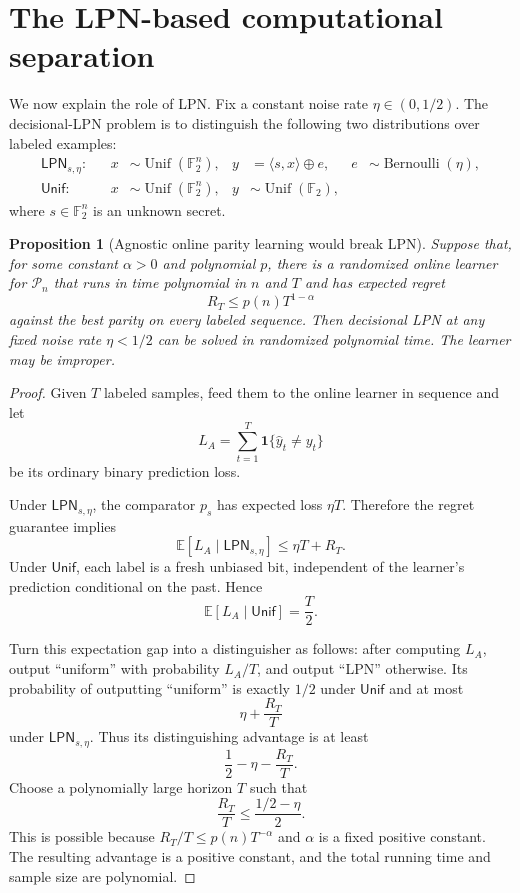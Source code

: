 \documentclass[11pt]{article}
\newtheorem{proposition}[theorem]{Proposition}
\theoremstyle{definition}
\theoremstyle{remark}
\newcommand{\F}{\mathbb{F}_2}
\newcommand{\Pn}{\mathcal{P}_n}
\newcommand{\ip}[2]{\langle #1,#2\rangle}
\newcommand{\ind}{\mathbf{1}}
\begin{document}
\section{The LPN-based computational separation}

We now explain the role of LPN.  Fix a constant noise rate
$\eta\in(0,1/2)$.  The decisional-LPN problem is to distinguish the following
two distributions over labeled examples:
\begin{align*}
\mathsf{LPN}_{s,\eta}:&
&x&\sim\operatorname{Unif}(\F^n),
&y&=\ip{s}{x}\oplus e,
&e&\sim\operatorname{Bernoulli}(\eta),\\
\mathsf{Unif}:&
&x&\sim\operatorname{Unif}(\F^n),
&y&\sim\operatorname{Unif}(\F),
\end{align*}
where $s\in\F^n$ is an unknown secret.

\begin{proposition}[Agnostic online parity learning would break LPN]
Suppose that, for some constant $\alpha>0$ and polynomial $p$, there is a
randomized online learner for $\Pn$ that runs in time polynomial in $n$ and
$T$ and has expected regret
\[
  R_T\leq p(n)T^{1-\alpha}
\]
against the best parity on every labeled sequence.  Then decisional LPN at
any fixed noise rate $\eta<1/2$ can be solved in randomized polynomial time.
The learner may be improper.
\end{proposition}

\begin{proof}
Given $T$ labeled samples, feed them to the online learner in sequence and
let
\[
  L_A
  =
  \sum_{t=1}^T \ind\{\widehat y_t\neq y_t\}
\]
be its ordinary binary prediction loss.

Under $\mathsf{LPN}_{s,\eta}$, the comparator $p_s$ has expected loss
$\eta T$.  Therefore the regret guarantee implies
\[
  \mathbb{E}[L_A\mid\mathsf{LPN}_{s,\eta}]
  \leq
  \eta T+R_T.
\]
Under $\mathsf{Unif}$, each label is a fresh unbiased bit, independent of the
learner's prediction conditional on the past.  Hence
\[
  \mathbb{E}[L_A\mid\mathsf{Unif}]=\frac{T}{2}.
\]

Turn this expectation gap into a distinguisher as follows: after computing
$L_A$, output ``uniform'' with probability $L_A/T$, and output ``LPN''
otherwise.  Its probability of outputting ``uniform'' is exactly $1/2$ under
$\mathsf{Unif}$ and at most
\[
  \eta+\frac{R_T}{T}
\]
under $\mathsf{LPN}_{s,\eta}$.  Thus its distinguishing advantage is at least
\[
  \frac12-\eta-\frac{R_T}{T}.
\]
Choose a polynomially large horizon $T$ such that
\[
  \frac{R_T}{T}
  \leq
  \frac{1/2-\eta}{2}.
\]
This is possible because
$R_T/T\leq p(n)T^{-\alpha}$ and $\alpha$ is a fixed positive constant.  The
resulting advantage is a positive constant, and the total running time and
sample size are polynomial.
\end{proof}
\end{document}

